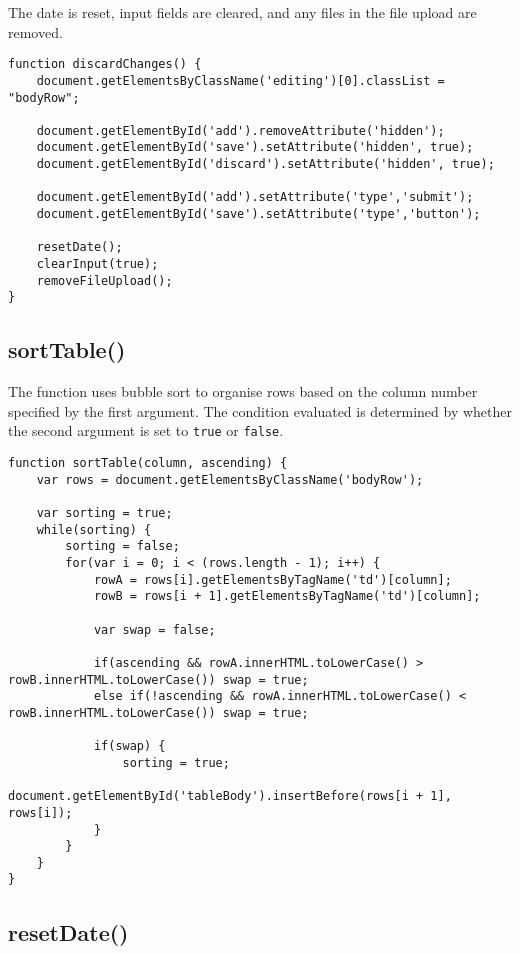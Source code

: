 \documentclass[letterpaper]{article}
\begin{document}
The date is reset, input fields are cleared, and any files in the file upload are removed.

\begin{lstlisting}[firstnumber=337]
function discardChanges() {
    document.getElementsByClassName('editing')[0].classList = "bodyRow";

    document.getElementById('add').removeAttribute('hidden');
    document.getElementById('save').setAttribute('hidden', true);
    document.getElementById('discard').setAttribute('hidden', true);

    document.getElementById('add').setAttribute('type','submit');
    document.getElementById('save').setAttribute('type','button');

    resetDate();
    clearInput(true);
    removeFileUpload();
}
\end{lstlisting}

\subsection{sortTable()}

The function uses bubble sort to organise rows based on the column number specified by the first argument.
The condition evaluated is determined by whether the second argument is set to \lstinline{true} or \lstinline{false}.

\begin{lstlisting}[firstnumber=352]
function sortTable(column, ascending) {
    var rows = document.getElementsByClassName('bodyRow');

    var sorting = true;
    while(sorting) {
        sorting = false;
        for(var i = 0; i < (rows.length - 1); i++) {
            rowA = rows[i].getElementsByTagName('td')[column];
            rowB = rows[i + 1].getElementsByTagName('td')[column];

            var swap = false;

            if(ascending && rowA.innerHTML.toLowerCase() > rowB.innerHTML.toLowerCase()) swap = true;
            else if(!ascending && rowA.innerHTML.toLowerCase() < rowB.innerHTML.toLowerCase()) swap = true;

            if(swap) {
                sorting = true;
                document.getElementById('tableBody').insertBefore(rows[i + 1], rows[i]);
            }
        }
    }
}
\end{lstlisting}

\subsection{resetDate()}
\end{document}
